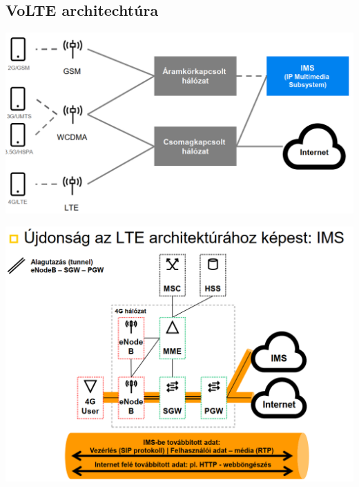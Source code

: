 \documentclass[10pt,a4paper]{article}
\begin{document}
\subsection{VoLTE architechtúra}
\begin{center}
	\includegraphics[width=0.7\linewidth]{src/VoLTEarch}
\end{center}
\begin{center}
	\includegraphics[width=0.8\linewidth]{src/VoLTEarch2}
\end{center}
\end{document}
